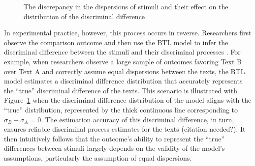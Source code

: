 \documentclass[
  authoryear,
  preprint,
  1p]{elsarticle}
\begin{document}
\begin{figure}


\caption{\label{fig-dispersion}The discrepancy in the dispersions of
stimuli and their effect on the distribution of the discriminal
difference}

\end{figure}%

In experimental practice, however, this process occurs in reverse.
Researchers first observe the comparison outcome and then use the BTL
model to infer the discriminal difference between the stimuli and their
discriminal processes \citep[pp.~373]{Thurstone_1927a}. For example,
when researchers observe a large sample of outcomes favoring Text B over
Text A and correctly assume equal dispersions between the texts, the BTL
model estimates a discriminal difference distribution that accurately
represents the ``true'' discriminal difference of the texts. This
scenario is illustrated with Figure~\ref{fig-dispersion} when the
discriminal difference distribution of the model aligns with the
``true'' distribution, represented by the thick continuous line
corresponding to \(\sigma_{B}-\sigma_{A}=0\). The estimation accuracy of
this discriminal difference, in turn, ensures reliable discriminal
process estimates for the texts (citation needed?). It then intuitively
follows that the outcome's ability to represent the ``true'' differences
between stimuli largely depends on the validity of the model's
assumptions, particularly the assumption of equal dispersions.
\end{document}
